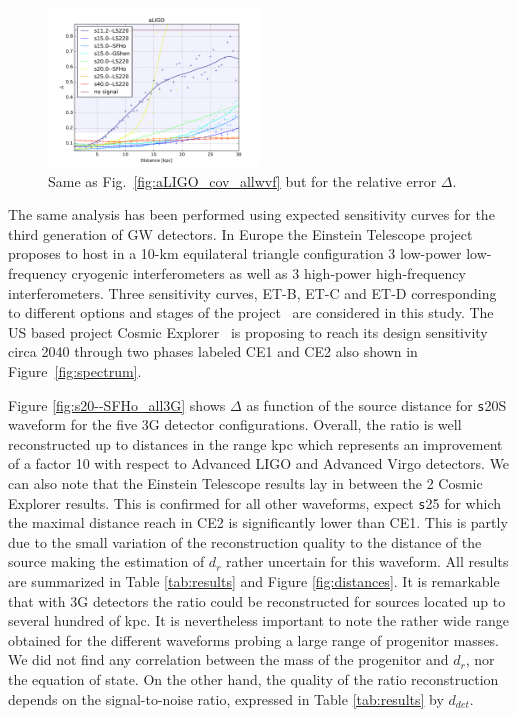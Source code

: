 \begin{figure}
  \centering
  \includegraphics[width=0.5\textwidth]{plots/aLIGO_delta_allwvfs}
 \caption{Same as Fig.~\ref{fig:aLIGO_cov_allwvf} but for the relative error $\Delta$. }
\label{fig:aLIGO_prec_allwvf}
\end{figure}

The same analysis has been performed using expected sensitivity curves for the third generation of
GW detectors. In Europe the Einstein Telescope project proposes to host in a 10-km
equilateral triangle configuration 3 low-power low-frequency cryogenic interferometers as well as 3
high-power high-frequency interferometers. Three sensitivity curves, ET-B, ET-C and ET-D corresponding
to different options and stages of the project~\cite{Hild_2011} are considered in this study.
The US based project Cosmic Explorer~\cite{reitze2019cosmic} is proposing to reach its design
sensitivity circa 2040 through two phases labeled CE1 and CE2 also shown in Figure~\ref{fig:spectrum}. 

Figure \ref{fig:s20--SFHo_all3G} shows $\Delta$ as function of the source distance for {\texttt s20S}
waveform for the five 3G detector configurations. Overall, the ratio is well reconstructed up to distances
in the range \unit[100--200]{kpc} which represents an improvement of a factor 10 with respect to
Advanced LIGO and Advanced Virgo detectors. We can also note that the Einstein Telescope results lay in
between the 2 Cosmic Explorer results. This is confirmed for all other waveforms, expect {\texttt s25}
for which the maximal distance reach in CE2 is significantly lower than CE1. This is partly due to the
small variation of the reconstruction quality to the distance of the source making the estimation of $d_r$
rather uncertain for this waveform. All results are summarized in Table \ref{tab:results} and Figure
\ref{fig:distances}. It is remarkable that with 3G detectors the ratio could be reconstructed for sources
located up to several hundred of kpc. It is nevertheless important to note the rather wide range obtained
for the different waveforms probing a large range of progenitor masses.
We did not find any correlation between the mass of the progenitor and $d_r$, nor the equation of state.
On the other hand, the quality
of the ratio reconstruction depends on the signal-to-noise ratio, expressed in Table \ref{tab:results} by
$d_{det}$.

